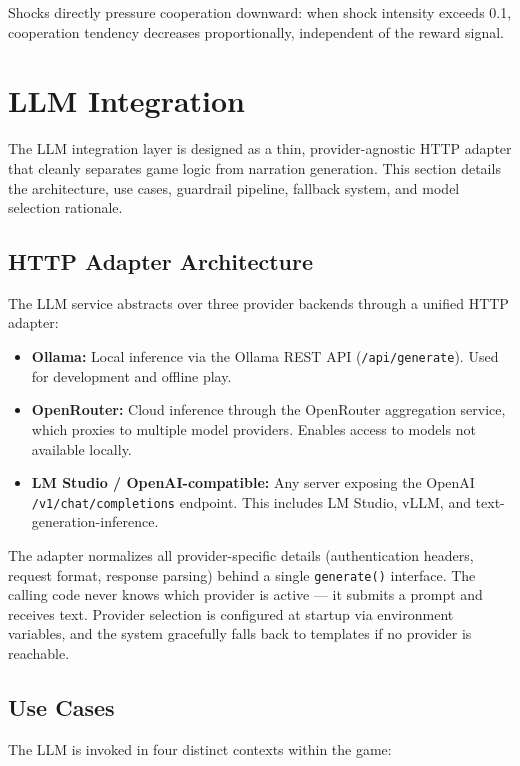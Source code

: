 \documentclass[12pt, a4paper, oneside]{report}
\begin{document}
Shocks directly pressure cooperation downward: when shock intensity exceeds 0.1, cooperation tendency decreases proportionally, independent of the reward signal.

\section{LLM Integration}
\label{sec:llm-integration}

The LLM integration layer is designed as a thin, provider-agnostic HTTP adapter that cleanly separates game logic from narration generation. This section details the architecture, use cases, guardrail pipeline, fallback system, and model selection rationale.

\subsection{HTTP Adapter Architecture}

The LLM service abstracts over three provider backends through a unified HTTP adapter:

\begin{itemize}[nosep]
    \item \textbf{Ollama:} Local inference via the Ollama REST API (\texttt{/api/generate}). Used for development and offline play.
    \item \textbf{OpenRouter:} Cloud inference through the OpenRouter aggregation service, which proxies to multiple model providers. Enables access to models not available locally.
    \item \textbf{LM Studio / OpenAI-compatible:} Any server exposing the OpenAI \texttt{/v1/chat/completions} endpoint. This includes LM Studio, vLLM, and text-generation-inference.
\end{itemize}

The adapter normalizes all provider-specific details (authentication headers, request format, response parsing) behind a single \texttt{generate()} interface. The calling code never knows which provider is active --- it submits a prompt and receives text. Provider selection is configured at startup via environment variables, and the system gracefully falls back to templates if no provider is reachable.

\subsection{Use Cases}

The LLM is invoked in four distinct contexts within the game:
\end{document}
